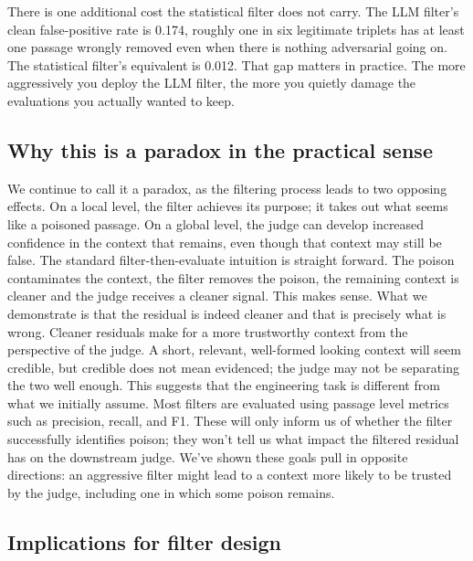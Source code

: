 There is one additional cost the statistical filter does not carry. The LLM filter's clean false-positive rate is 0.174, roughly one in six legitimate triplets has at least one passage wrongly removed even when there is nothing adversarial going on. The statistical filter's equivalent is 0.012. That gap matters in practice. The more aggressively you deploy the LLM filter, the more you quietly damage the evaluations you actually wanted to keep.


\subsection{Why this is a paradox in the practical sense}

We continue to call it a paradox, as the filtering process leads to two opposing effects. On a local level, the filter achieves its purpose; it takes out what seems like a poisoned passage. On a global level, the judge can develop increased confidence in the context that remains, even though that context may still be false.
The standard filter-then-evaluate intuition is straight forward. The poison contaminates the context, the filter removes the poison, the remaining context is cleaner and the judge receives a cleaner signal. This makes sense.
What we demonstrate is that the residual is indeed cleaner and that is precisely what is wrong. Cleaner residuals make for a more trustworthy context from the perspective of the judge. A short, relevant, well-formed looking context will seem credible, but credible does not mean evidenced; the judge may not be separating the two well enough.
This suggests that the engineering task is different from what we initially assume. Most filters are evaluated using passage level metrics such as precision, recall, and F1. These will only inform us of whether the filter successfully identifies poison; they won't tell us what impact the filtered residual has on the downstream judge. We've shown these goals pull in opposite directions: an aggressive filter might lead to a context more likely to be trusted by the judge, including one in which some poison remains.


\subsection{Implications for filter design}


